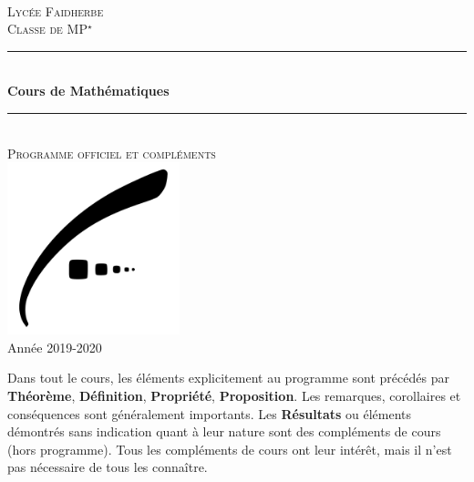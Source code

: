 \documentclass{report}
\begin{document}
\pagestyle{empty}
\begin{center}

    ~ \vfill

    \textsc{\LARGE Lycée Faidherbe}\\[1.5cm]
    \textsc{\Large Classe de MP$^\star$}\\[0.5cm]

    \rule{\linewidth}{0.5mm} \\[0.4cm]
    {\huge \bfseries Cours de Mathématiques }\\[0.1cm]
    \rule{\linewidth}{0.5mm} \\[0.4cm]
    \textsc{\large Programme officiel et compléments}\\[1.5cm]

    \vfill
    \includegraphics[width=5cm]{faidherbe.pdf}\\[1cm]
    \vfill
    {\large Année 2019-2020}\\
\end{center}

\dominitoc \tableofcontents

Dans tout le cours, les éléments explicitement au programme sont précédés par \textbf{Théorème}, \textbf{Définition}, \textbf{Propriété}, \textbf{Proposition}. Les remarques, corollaires et conséquences sont généralement importants. Les \textbf{Résultats} ou éléments démontrés sans indication quant à leur nature sont des compléments de cours (hors programme). Tous les compléments de cours ont leur intérêt, mais il n'est pas nécessaire de tous les connaître.
\end{document}
